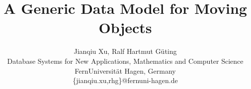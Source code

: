 \documentclass{article}
\begin{document}
\title{A Generic Data Model for Moving Objects}
\author{%
\fontsize{11}{11}\selectfont%
{Jianqiu Xu, Ralf Hartmut G\"uting}
\vspace{1.6mm}\\
\fontsize{10}{10}\selectfont%
Database Systems for New Applications, Mathematics and Computer Science\\
\fontsize{10}{10}\selectfont%
FernUniversit\"at Hagen, Germany\\
\fontsize{10}{10}\selectfont%
 \{jianqiu.xu,rhg\}@fernuni-hagen.de
}

\maketitle
\newtheorem{Statement}{Definition}[section]
\newtheorem{lemma}{Lemma}
\newtheorem*{proof}{Proof}


%
%

 


%
\end{document}
